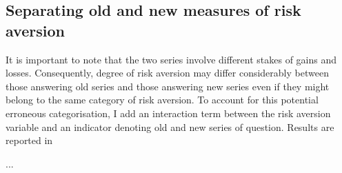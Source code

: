 \documentclass[]{article}
\begin{document}
\subsection{Separating old and new measures of risk aversion}

It is important to note that the two series involve different stakes of gains and losses. Consequently, degree of risk aversion may differ considerably between those answering old series and those answering new series even if they might belong to the same category of risk aversion. To account for this potential erroneous categorisation, I add an interaction term between the risk aversion variable and an indicator denoting old and new series of question. Results are reported in 

    
\begin{ThreePartTable}
	\centering
	\setlength{\extrarowheight}{0.2em}
	\begin{TableNotes}\footnotesize
		\item ... 
	\end{TableNotes}
	
\end{ThreePartTable}


\pagebreak

%
%
\end{document}
